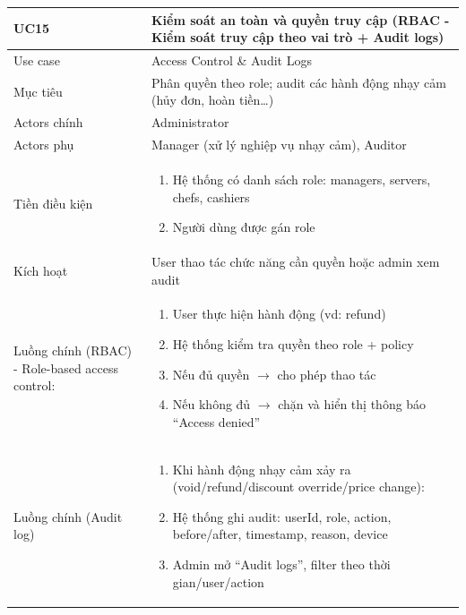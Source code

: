 \begin{longtable}{|>{\raggedright\arraybackslash}p{}|>{\raggedright\arraybackslash}p{}|}
\hline
\textbf{UC15} & \textbf{Kiểm soát an toàn và quyền truy cập (RBAC - Kiểm soát truy cập theo vai trò + Audit logs)} \\
\hline
Use case & Access Control \& Audit Logs \\
\hline
Mục tiêu & Phân quyền theo role; audit các hành động nhạy cảm (hủy đơn, hoàn tiền…) \\
\hline
Actors chính & Administrator \\
\hline
Actors phụ & Manager (xử lý nghiệp vụ nhạy cảm), Auditor \\
\hline
Tiền điều kiện &
\vspace{-0.5em}
\begin{enumerate}[leftmargin=*]
\item Hệ thống có danh sách role: managers, servers, chefs, cashiers
\item Người dùng được gán role
\end{enumerate}
\vspace{-0.5em}
\\
\hline
Kích hoạt & User thao tác chức năng cần quyền hoặc admin xem audit \\
\hline
Luồng chính (RBAC) - Role-based access control: &
\vspace{-0.5em}
\begin{enumerate}[leftmargin=*]
\item User thực hiện hành động (vd: refund)
\item Hệ thống kiểm tra quyền theo role + policy
\item Nếu đủ quyền $\rightarrow$ cho phép thao tác
\item Nếu không đủ $\rightarrow$ chặn và hiển thị thông báo “Access denied”
\end{enumerate}
\vspace{-0.5em}
\\
\hline
Luồng chính (Audit log) &
\vspace{-0.5em}
\begin{enumerate}[leftmargin=*]
\item Khi hành động nhạy cảm xảy ra (void/refund/discount override/price change):
\item Hệ thống ghi audit: userId, role, action, before/after, timestamp, reason, device
\item Admin mở “Audit logs”, filter theo thời gian/user/action

\end{enumerate}
\end{longtable}
